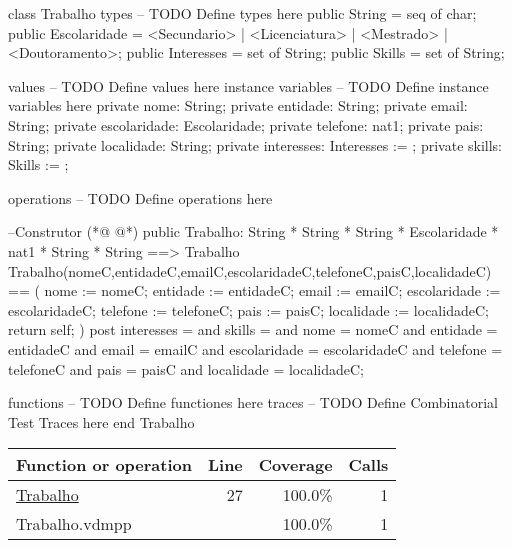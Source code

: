 \begin{vdmpp}[breaklines=true]
class Trabalho
types
-- TODO Define types here
 public String = seq of char;
 public Escolaridade = <Secundario> | <Licenciatura> | <Mestrado> | <Doutoramento>;
 public Interesses = set of String;
 public Skills = set of String;
 
values
-- TODO Define values here
instance variables
-- TODO Define instance variables here
 private nome: String;
 private entidade: String;
 private email: String;
 private escolaridade: Escolaridade;
 private telefone: nat1;
 private pais: String;
 private localidade: String;
 private interesses: Interesses := {};
 private skills: Skills := {};
 
operations
-- TODO Define operations here

 --Construtor
(*@
\label{Trabalho:27}
@*)
 public Trabalho: String * String * String * Escolaridade * nat1 * String * String ==> Trabalho
 Trabalho(nomeC,entidadeC,emailC,escolaridadeC,telefoneC,paisC,localidadeC) == (
  nome := nomeC;
  entidade := entidadeC;
  email := emailC;
  escolaridade := escolaridadeC;
  telefone := telefoneC;
  pais := paisC;
  localidade := localidadeC;
  return self;
 )
 post interesses = {} and
   skills = {} and
   nome = nomeC and
   entidade = entidadeC and
   email = emailC and
   escolaridade = escolaridadeC and
   telefone = telefoneC and
   pais = paisC and
   localidade = localidadeC;
   
functions
-- TODO Define functiones here
traces
-- TODO Define Combinatorial Test Traces here
end Trabalho
\end{vdmpp}
\bigskip
\begin{longtable}{|l|r|r|r|}
\hline
Function or operation & Line & Coverage & Calls \\
\hline
\hline
\hyperref[Trabalho:27]{Trabalho} & 27&100.0\% & 1 \\
\hline
\hline
Trabalho.vdmpp & & 100.0\% & 1 \\
\hline
\end{longtable}

